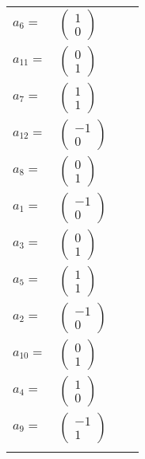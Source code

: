 \documentclass[1p]{elsarticle_modified}
\theoremstyle{definition}
\begin{document}
\begin{tabular}{m{7pt} m{180pt} m{7pt} m{180pt} }
\flushright $a_{6}=$&$\begin{pmatrix}1\\0\end{pmatrix}$ \\
\flushright $a_{11}=$&$\begin{pmatrix}0\\1\end{pmatrix}$ \\
\flushright $a_{7}=$&$\begin{pmatrix}1\\1\end{pmatrix}$ \\
\flushright $a_{12}=$&$\begin{pmatrix}-1\\0\end{pmatrix}$ \\
\flushright $a_{8}=$&$\begin{pmatrix}0\\1\end{pmatrix}$ \\
\flushright $a_{1}=$&$\begin{pmatrix}-1\\0\end{pmatrix}$ \\
\flushright $a_{3}=$&$\begin{pmatrix}0\\1\end{pmatrix}$ \\
\flushright $a_{5}=$&$\begin{pmatrix}1\\1\end{pmatrix}$ \\
\flushright $a_{2}=$&$\begin{pmatrix}-1\\0\end{pmatrix}$ \\
\flushright $a_{10}=$&$\begin{pmatrix}0\\1\end{pmatrix}$ \\
\flushright $a_{4}=$&$\begin{pmatrix}1\\0\end{pmatrix}$ \\
\flushright $a_{9}=$&$\begin{pmatrix}-1\\1\end{pmatrix}$\\&\end{tabular}
\end{document}

